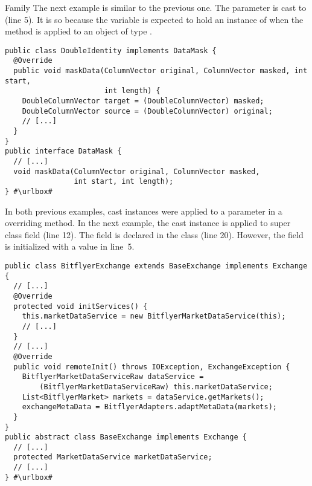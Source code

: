\begin{pattern}{Family}
The next example is similar to the previous one.
The  parameter is cast to  (line 5).
It is so because the  variable is expected to hold an instance of  when the  method is applied to an object of type .
\def\urlvar{http://bit.ly/apache_orc_2SE4C2m}
\begin{verbatim}
public class DoubleIdentity implements DataMask {
  @Override
  public void maskData(ColumnVector original, ColumnVector masked, int start,
                       int length) {
    DoubleColumnVector target = (DoubleColumnVector) masked;
    DoubleColumnVector source = (DoubleColumnVector) original;
    // [...]
  }
}
public interface DataMask {
  // [...]
  void maskData(ColumnVector original, ColumnVector masked,
                int start, int length);
} #\urlbox#
\end{verbatim}

In both previous examples,
cast instances were applied to a parameter in a overriding method.
In the next example, the cast instance is applied to super class field (line 12).
The field is declared in the  class (line 20).
However, the field is initialized with a  value in line~5.

\def\urlvar{http://bit.ly/knowm_XChange_2UPPDj9}
\begin{verbatim}
public class BitflyerExchange extends BaseExchange implements Exchange {
  // [...]
  @Override
  protected void initServices() {
    this.marketDataService = new BitflyerMarketDataService(this);
    // [...]
  }
  // [...]
  @Override
  public void remoteInit() throws IOException, ExchangeException {
    BitflyerMarketDataServiceRaw dataService =
        (BitflyerMarketDataServiceRaw) this.marketDataService;
    List<BitflyerMarket> markets = dataService.getMarkets();
    exchangeMetaData = BitflyerAdapters.adaptMetaData(markets);
  }
}
public abstract class BaseExchange implements Exchange {
  // [...]
  protected MarketDataService marketDataService;
  // [...]
} #\urlbox#
\end{verbatim}



\end{pattern}
